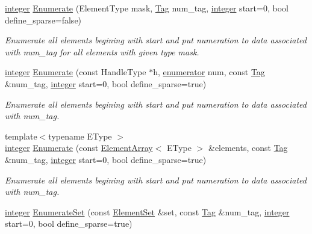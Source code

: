 \begin{DoxyCompactItemize}
\hyperlink{classINMOST_1_1Storage_aec96942bc647417a801e2895b45964d2}{integer} \hyperlink{classINMOST_1_1Mesh_a9787ba8c75b41b76b89aeeae2e8aefad}{Enumerate} (Element\-Type mask, \hyperlink{classINMOST_1_1Tag}{Tag} num\-\_\-tag, \hyperlink{classINMOST_1_1Storage_aec96942bc647417a801e2895b45964d2}{integer} start=0, bool define\-\_\-sparse=false)
\begin{DoxyCompactList}\small\item\em Enumerate all elements begining with start and put numeration to data associated with num\-\_\-tag for all elements with given type mask. \end{DoxyCompactList}\item 
\hyperlink{classINMOST_1_1Storage_aec96942bc647417a801e2895b45964d2}{integer} \hyperlink{classINMOST_1_1Mesh_a5dc8c51bea6707ccedc76dba47ea0d48}{Enumerate} (const Handle\-Type $\ast$h, \hyperlink{classINMOST_1_1Storage_ae333dfced6fa9cfde0c8e7dcf1b0cc2b}{enumerator} num, const \hyperlink{classINMOST_1_1Tag}{Tag} \&num\-\_\-tag, \hyperlink{classINMOST_1_1Storage_aec96942bc647417a801e2895b45964d2}{integer} start=0, bool define\-\_\-sparse=true)
\begin{DoxyCompactList}\small\item\em Enumerate all elements begining with start and put numeration to data associated with num\-\_\-tag. \end{DoxyCompactList}\item 
{\footnotesize template$<$typename E\-Type $>$ }\\\hyperlink{classINMOST_1_1Storage_aec96942bc647417a801e2895b45964d2}{integer} \hyperlink{classINMOST_1_1Mesh_a92e7888589b79355fa273ad67c8c9bb5}{Enumerate} (const \hyperlink{classINMOST_1_1ElementArray}{Element\-Array}$<$ E\-Type $>$ \&elements, const \hyperlink{classINMOST_1_1Tag}{Tag} \&num\-\_\-tag, \hyperlink{classINMOST_1_1Storage_aec96942bc647417a801e2895b45964d2}{integer} start=0, bool define\-\_\-sparse=true)
\begin{DoxyCompactList}\small\item\em Enumerate all elements begining with start and put numeration to data associated with num\-\_\-tag. \end{DoxyCompactList}\item 
\hyperlink{classINMOST_1_1Storage_aec96942bc647417a801e2895b45964d2}{integer} \hyperlink{classINMOST_1_1Mesh_a0239ff055f17c76ba19ef8a169b14962}{Enumerate\-Set} (const \hyperlink{classINMOST_1_1ElementSet}{Element\-Set} \&set, const \hyperlink{classINMOST_1_1Tag}{Tag} \&num\-\_\-tag, \hyperlink{classINMOST_1_1Storage_aec96942bc647417a801e2895b45964d2}{integer} start=0, bool define\-\_\-sparse=true)

\end{DoxyCompactItemize}
